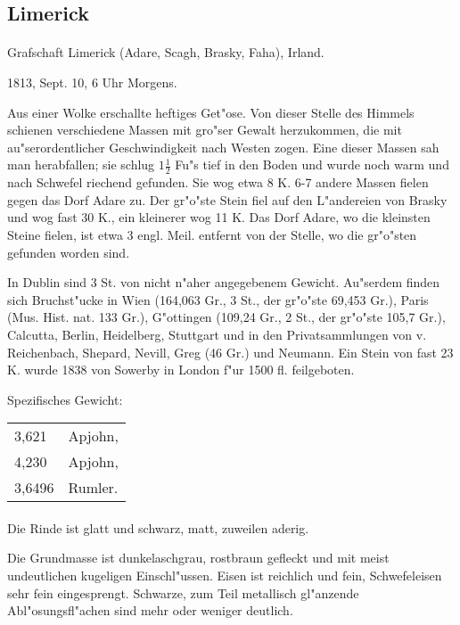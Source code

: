 \documentclass[a4paper, 11pt, oneside]{article}
\begin{document}
\subsection{Limerick}
\normalsize
\paragraph{}
Grafschaft Limerick (Adare, Scagh, Brasky, Faha), Irland.

1813, Sept. 10, 6 Uhr Morgens.

Aus einer Wolke erschallte heftiges Get"ose. Von dieser Stelle des Himmels schienen verschiedene Massen mit gro"ser Gewalt herzukommen, die mit au"serordentlicher Geschwindigkeit nach Westen zogen. Eine dieser Massen sah man herabfallen; sie schlug $1\frac{1}{2}$ Fu"s tief in den Boden und wurde noch warm und nach Schwefel riechend gefunden. Sie wog etwa 8 K. 6-7 andere Massen fielen gegen das Dorf Adare zu. Der gr"o"ste Stein fiel auf den L"andereien von Brasky und wog fast 30 K., ein kleinerer wog 11 K. Das Dorf Adare, wo die kleinsten Steine fielen, ist etwa 3 engl. Meil. entfernt von der Stelle, wo die gr"o"sten gefunden worden sind.

In Dublin sind 3 St. von nicht n"aher angegebenem Gewicht. Au"serdem finden sich Bruchst"ucke in Wien (164,063 Gr., 3 St., der gr"o"ste 69,453 Gr.), Paris (Mus. Hist. nat. 133 Gr.), G"ottingen (109,24 Gr., 2 St., der gr"o"ste 105,7 Gr.), Calcutta, Berlin, Heidelberg, Stuttgart und in den Privatsammlungen von v. Reichenbach, Shepard, Nevill, Greg (46 Gr.) und Neumann. Ein Stein von fast 23 K. wurde 1838 von Sowerby in London f"ur 1500 fl. feilgeboten.

Spezifisches Gewicht:
\begin{table}[!ht]
    \centering
    \begin{tabular}{l l}
        3,621 & Apjohn,\\
        4,230 & Apjohn,\\
        3,6496 & Rumler.
    \end{tabular}
\end{table}
\paragraph{}
Die Rinde ist glatt und schwarz, matt, zuweilen aderig.

Die Grundmasse ist dunkelaschgrau, rostbraun gefleckt und mit meist undeutlichen kugeligen Einschl"ussen. Eisen ist reichlich und fein, Schwefeleisen sehr fein eingesprengt. Schwarze, zum Teil metallisch gl"anzende Abl"osungsfl"achen sind mehr oder weniger deutlich.
\end{document}
